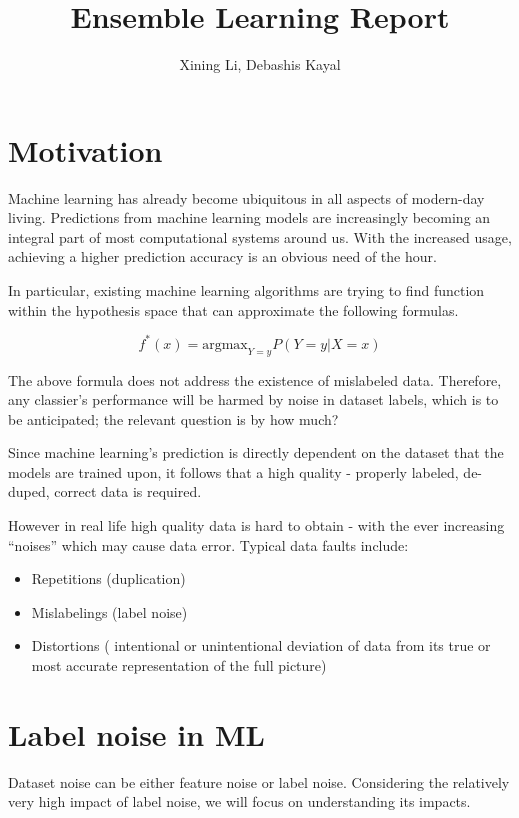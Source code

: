 \documentclass{article}
\author{Xining Li, Debashis Kayal}
\title {Ensemble Learning Report}
\begin{document}
\maketitle

\section{Motivation}

Machine learning has already become ubiquitous in all aspects of modern-day living. Predictions from machine learning models are increasingly becoming an integral part of most computational systems around us. With the increased usage, achieving a higher prediction accuracy is an obvious need of the hour. 


In particular, existing machine learning algorithms are trying to find function within the hypothesis space that can approximate the following formulas.

\begin{equation}
    f^*(x) = {\mathrm {argmax}}_{Y=y} P (Y=y|X=x)
\end{equation}

The above formula does not address the existence of mislabeled data. Therefore, any classier's performance will be harmed by noise in dataset labels, which is to be anticipated; the relevant question is by how much?

Since machine learning’s prediction is directly dependent on the dataset that the models are trained upon, it follows that a high quality - properly labeled, de-duped, correct data is required. 

However in real life high quality data is hard to obtain - with the ever increasing “noises” which may cause data error. Typical data faults include: 

\begin{itemize}
    \item Repetitions (duplication)
    \item Mislabelings (label noise)
    \item Distortions ( intentional or unintentional deviation of data from its true or most accurate representation of the full picture)
\end{itemize}

\section{Label noise in ML}

Dataset noise can be either feature noise or label noise. Considering the relatively very high impact of label noise, we will focus on understanding its impacts.
\end{document}
